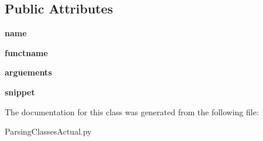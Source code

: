\subsection*{Public Attributes}
\begin{DoxyCompactItemize}
\item 
{\bfseries name}\hypertarget{class_parsing_classes_actual_1_1_multiple__member__function_a8d1095e288eba5cd271dd0300590ecc5}{}\label{class_parsing_classes_actual_1_1_multiple__member__function_a8d1095e288eba5cd271dd0300590ecc5}

\item 
{\bfseries functname}\hypertarget{class_parsing_classes_actual_1_1_multiple__member__function_afe344b4cf0e1d608d4e5697364bcbd93}{}\label{class_parsing_classes_actual_1_1_multiple__member__function_afe344b4cf0e1d608d4e5697364bcbd93}

\item 
{\bfseries arguements}\hypertarget{class_parsing_classes_actual_1_1_multiple__member__function_a19dfea13ddeb0c4340b987575e5f2402}{}\label{class_parsing_classes_actual_1_1_multiple__member__function_a19dfea13ddeb0c4340b987575e5f2402}

\item 
{\bfseries snippet}\hypertarget{class_parsing_classes_actual_1_1_multiple__member__function_a766af60b5f794ead87ffcc726b50466e}{}\label{class_parsing_classes_actual_1_1_multiple__member__function_a766af60b5f794ead87ffcc726b50466e}

\end{DoxyCompactItemize}


The documentation for this class was generated from the following file\+:\begin{DoxyCompactItemize}
\item 
Parsing\+Classes\+Actual.\+py\end{DoxyCompactItemize}
